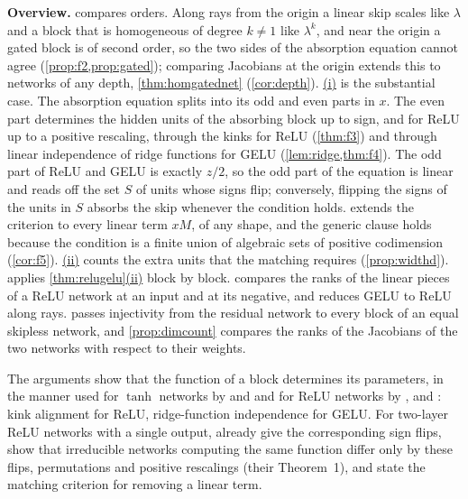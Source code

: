 \documentclass[10pt]{article}
\theoremstyle{definition}
\theoremstyle{remark}
\newcommand{\para}[1]{\smallskip\noindent\textbf{#1}\hspace{0.5em}}
\DeclareRobustCommand{\cpref}[2]{\hyperref[#1:#2]{\cref*{#1}(#2)}}
\DeclareRobustCommand{\Cpref}[2]{\hyperref[#1:#2]{\Cref*{#1}(#2)}}
\begin{document}
\para{Overview.}  compares orders. Along rays from the origin a linear skip scales like $\lambda$ and a block that is homogeneous of degree $k \neq 1$ like $\lambda^k$, and near the origin a gated block is of second order, so the two sides of the absorption equation cannot agree (\cref{prop:f2,prop:gated}); comparing Jacobians at the origin extends this to networks of any depth, \cref{thm:homgatednet} (\cref{cor:depth}). \Cpref{thm:relugelu}{i} is the substantial case. The absorption equation splits into its odd and even parts in $x$. The even part determines the hidden units of the absorbing block up to sign, and for ReLU up to a positive rescaling, through the kinks for ReLU (\cref{thm:f3}) and through linear independence of ridge functions for GELU (\cref{lem:ridge,thm:f4}). The odd part of ReLU and GELU is exactly $z/2$, so the odd part of the equation is linear and reads off the set $S$ of units whose signs flip; conversely, flipping the signs of the units in $S$ absorbs the skip whenever the condition holds.  extends the criterion to every linear term $xM$, of any shape, and the generic clause holds because the condition is a finite union of algebraic sets of positive codimension (\cref{cor:f5}). \Cpref{thm:relugelu}{ii} counts the extra units that the matching requires (\cref{prop:widthd}).  applies \cpref{thm:relugelu}{ii} block by block.  compares the ranks of the linear pieces of a ReLU network at an input and at its negative, and reduces GELU to ReLU along rays.  passes injectivity from the residual network to every block of an equal skipless network, and \cref{prop:dimcount} compares the ranks of the Jacobians of the two networks with respect to their weights.

The arguments show that the function of a block determines its parameters, in the manner used for $\tanh$ networks by \citet{sussmann1992} and \citet{fefferman1994} and for ReLU networks by \citet{buithimai2020functional}, \citet{petzka2020symmetries} and \citet{rolnick2020reverse}: kink alignment for ReLU, ridge-function independence for GELU. For two-layer ReLU networks with a single output, \citet[Section~3]{petzka2020symmetries} already give the corresponding sign flips, show that irreducible networks computing the same function differ only by these flips, permutations and positive rescalings (their Theorem~1), and state the matching criterion for removing a linear term.
\end{document}

